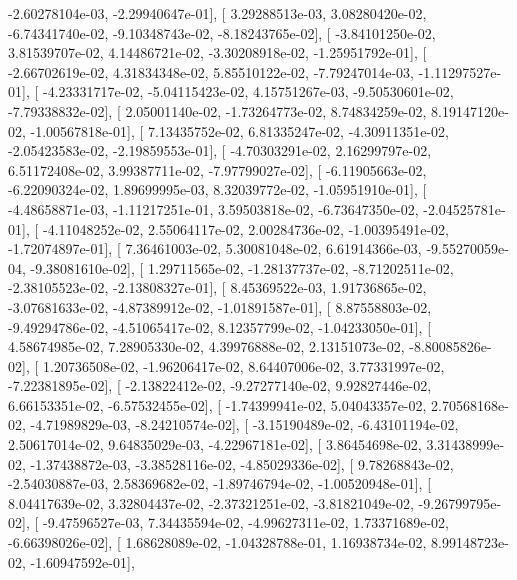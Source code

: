 \documentclass{article}
\begin{document}
         -2.60278104e-03,  -2.29940647e-01],
       [  3.29288513e-03,   3.08280420e-02,  -6.74341740e-02,
         -9.10348743e-02,  -8.18243765e-02],
       [ -3.84101250e-02,   3.81539707e-02,   4.14486721e-02,
         -3.30208918e-02,  -1.25951792e-01],
       [ -2.66702619e-02,   4.31834348e-02,   5.85510122e-02,
         -7.79247014e-03,  -1.11297527e-01],
       [ -4.23331717e-02,  -5.04115423e-02,   4.15751267e-03,
         -9.50530601e-02,  -7.79338832e-02],
       [  2.05001140e-02,  -1.73264773e-02,   8.74834259e-02,
          8.19147120e-02,  -1.00567818e-01],
       [  7.13435752e-02,   6.81335247e-02,  -4.30911351e-02,
         -2.05423583e-02,  -2.19859553e-01],
       [ -4.70303291e-02,   2.16299797e-02,   6.51172408e-02,
          3.99387711e-02,  -7.97799027e-02],
       [ -6.11905663e-02,  -6.22090324e-02,   1.89699995e-03,
          8.32039772e-02,  -1.05951910e-01],
       [ -4.48658871e-03,  -1.11217251e-01,   3.59503818e-02,
         -6.73647350e-02,  -2.04525781e-01],
       [ -4.11048252e-02,   2.55064117e-02,   2.00284736e-02,
         -1.00395491e-02,  -1.72074897e-01],
       [  7.36461003e-02,   5.30081048e-02,   6.61914366e-03,
         -9.55270059e-04,  -9.38081610e-02],
       [  1.29711565e-02,  -1.28137737e-02,  -8.71202511e-02,
         -2.38105523e-02,  -2.13808327e-01],
       [  8.45369522e-03,   1.91736865e-02,  -3.07681633e-02,
         -4.87389912e-02,  -1.01891587e-01],
       [  8.87558803e-02,  -9.49294786e-02,  -4.51065417e-02,
          8.12357799e-02,  -1.04233050e-01],
       [  4.58674985e-02,   7.28905330e-02,   4.39976888e-02,
          2.13151073e-02,  -8.80085826e-02],
       [  1.20736508e-02,  -1.96206417e-02,   8.64407006e-02,
          3.77331997e-02,  -7.22381895e-02],
       [ -2.13822412e-02,  -9.27277140e-02,   9.92827446e-02,
          6.66153351e-02,  -6.57532455e-02],
       [ -1.74399941e-02,   5.04043357e-02,   2.70568168e-02,
         -4.71989829e-03,  -8.24210574e-02],
       [ -3.15190489e-02,  -6.43101194e-02,   2.50617014e-02,
          9.64835029e-03,  -4.22967181e-02],
       [  3.86454698e-02,   3.31438999e-02,  -1.37438872e-03,
         -3.38528116e-02,  -4.85029336e-02],
       [  9.78268843e-02,  -2.54030887e-03,   2.58369682e-02,
         -1.89746794e-02,  -1.00520948e-01],
       [  8.04417639e-02,   3.32804437e-02,  -2.37321251e-02,
         -3.81821049e-02,  -9.26799795e-02],
       [ -9.47596527e-03,   7.34435594e-02,  -4.99627311e-02,
          1.73371689e-02,  -6.66398026e-02],
       [  1.68628089e-02,  -1.04328788e-01,   1.16938734e-02,
          8.99148723e-02,  -1.60947592e-01],
\end{document}
